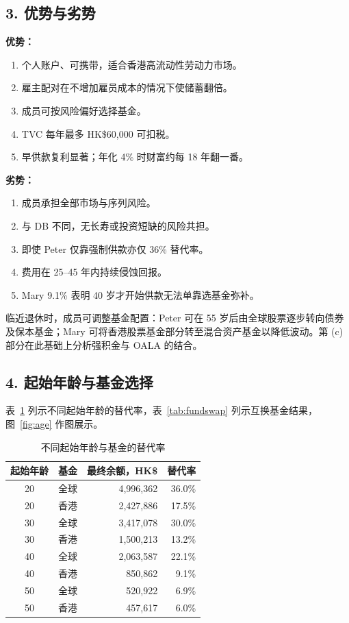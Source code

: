 \documentclass[12pt, letterpaper]{ctexart}
\begin{document}
\subsection*{3. 优势与劣势}

\textbf{优势：}
\begin{enumerate}
  \item 个人账户、可携带，适合香港高流动性劳动力市场。
  \item 雇主配对在不增加雇员成本的情况下使储蓄翻倍。
  \item 成员可按风险偏好选择基金。
  \item TVC 每年最多 HK\$60,000 可扣税。
  \item 早供款复利显著；年化 4\% 时财富约每 18 年翻一番。
\end{enumerate}

\textbf{劣势：}
\begin{enumerate}
  \item 成员承担全部市场与序列风险。
  \item 与 DB 不同，无长寿或投资短缺的风险共担。
  \item 即使 Peter 仅靠强制供款亦仅 36\% 替代率。
  \item 费用在 25--45 年内持续侵蚀回报。
  \item Mary 9.1\% 表明 40 岁才开始供款无法单靠选基金弥补。
\end{enumerate}

临近退休时，成员可调整基金配置：Peter 可在 55 岁后由全球股票逐步转向债券及保本基金；Mary 可将香港股票基金部分转至混合资产基金以降低波动。第 (c) 部分在此基础上分析强积金与 OALA 的结合。

\subsection*{4. 起始年龄与基金选择}

表~\ref{tab:age} 列示不同起始年龄的替代率，表~\ref{tab:fundswap} 列示互换基金结果，图~\ref{fig:age} 作图展示。

\begin{table}[H]
  \centering
  \caption{不同起始年龄与基金的替代率}
  \label{tab:age}
  \small
  \begin{tabular}{@{}ccrr@{}}
    \toprule
    起始年龄 & 基金 & 最终余额，HK\$ & 替代率 \\
    \midrule
    20 & 全球 & 4,996,362 & 36.0\% \\
    20 & 香港 & 2,427,886 & 17.5\% \\
    30 & 全球 & 3,417,078 & 30.0\% \\
    30 & 香港 & 1,500,213 & 13.2\% \\
    40 & 全球 & 2,063,587 & 22.1\% \\
    40 & 香港 & 850,862 & 9.1\% \\
    50 & 全球 & 520,922 & 6.9\% \\
    50 & 香港 & 457,617 & 6.0\% \\
    \bottomrule
  \end{tabular}
\end{table}
\end{document}
